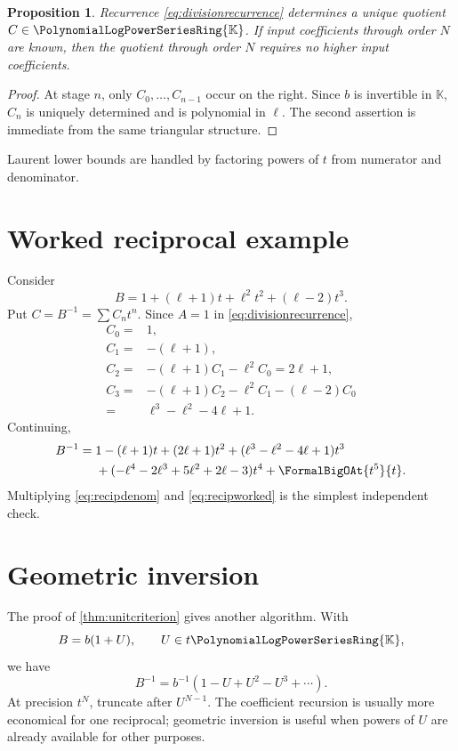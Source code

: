 \documentclass[11pt,oneside,openany]{book}
\newtheorem{proposition}[theorem]{Proposition}
\newcommand{\K}{\mathbb{K}}
\newcommand{\Rring}{\PolynomialLogPowerSeriesRing{\K}}
\begin{document}
\begin{proposition}\label{prop:quotientrec}
Recurrence \cref{eq:divisionrecurrence} determines a unique quotient
\(C\in\Rring\).  If input coefficients through order \(N\) are known, then the
quotient through order \(N\) requires no higher input coefficients.
\end{proposition}

\begin{proof}
At stage \(n\), only \(C_0,\ldots,C_{n-1}\) occur on the right.  Since \(b\)
is invertible in \(\K\), \(C_n\) is uniquely determined and is polynomial in
\(\ell\).  The second assertion is immediate from the same triangular
structure.
\end{proof}

Laurent lower bounds are handled by factoring powers of \(t\) from numerator
and denominator.

\section{Worked reciprocal example}
Consider
\begin{equation}\label{eq:recipdenom}
 B=1+(\ell+1)t+\ell^2t^2+(\ell-2)t^3.
\end{equation}
Put \(C=B^{-1}=\sum C_nt^n\).  Since \(A=1\) in
\cref{eq:divisionrecurrence},
\begin{align*}
 C_0={}&1,\\
 C_1={}&-(\ell+1),\\
 C_2={}&-(\ell+1)C_1-\ell^2C_0=2\ell+1,\\
 C_3={}&-(\ell+1)C_2-\ell^2C_1-(\ell-2)C_0\\
      ={}&\ell^3-\ell^2-4\ell+1.
\end{align*}
Continuing,
\begin{align}\label{eq:recipworked}
 B^{-1}={}&1-(\ell+1)t+(2\ell+1)t^2
 +(\ell^3-\ell^2-4\ell+1)t^3\notag\\
 &+(-\ell^4-2\ell^3+5\ell^2+2\ell-3)t^4
 +\FormalBigOAt{t^5}{t}.
\end{align}
Multiplying \cref{eq:recipdenom} and \cref{eq:recipworked} is the simplest
independent check.

\section{Geometric inversion}
The proof of \cref{thm:unitcriterion} gives another algorithm.  With
\[
 B=b(1+U),
 \qquad U\in t\Rring,
\]
we have
\begin{equation}\label{eq:geometricrecip}
 B^{-1}=b^{-1}(1-U+U^2-U^3+\cdots).
\end{equation}
At precision \(t^N\), truncate after \(U^{N-1}\).  The coefficient recursion
is usually more economical for one reciprocal; geometric inversion is useful
when powers of \(U\) are already available for other purposes.
\end{document}
